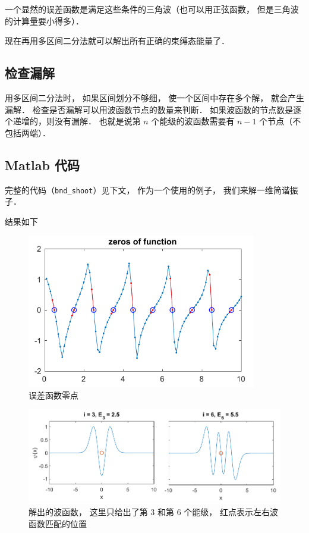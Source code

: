 一个显然的误差函数是满足这些条件的三角波（也可以用正弦函数， 但是三角波的计算量要小得多）．

现在再用多区间二分法就可以解出所有正确的束缚态能量了．

\subsection{检查漏解}
用多区间二分法时， 如果区间划分不够细， 使一个区间中存在多个解， 就会产生漏解． 检查是否漏解可以用波函数节点的数量来判断． 如果波函数的节点数是逐个递增的，则没有漏解． 也就是说第 $n$ 个能级的波函数需要有 $n - 1$ 个节点（不包括两端）．

\subsection{Matlab 代码}

完整的代码（\lstinline|bnd_shoot|）见下文， 作为一个使用的例子， 我们来解一维简谐振子．


结果如下
\begin{figure}[ht]
\centering
\includegraphics[width=10cm]{./figures/BndSho_1.pdf}
\caption{误差函数零点} \label{BndSho_fig1}
\end{figure}

\begin{figure}[ht]
\centering
\includegraphics[width=15cm]{./figures/BndSho_2.pdf}
\caption{解出的波函数， 这里只给出了第 3 和第 6 个能级， 红点表示左右波函数匹配的位置} \label{BndSho_fig2}
\end{figure}

